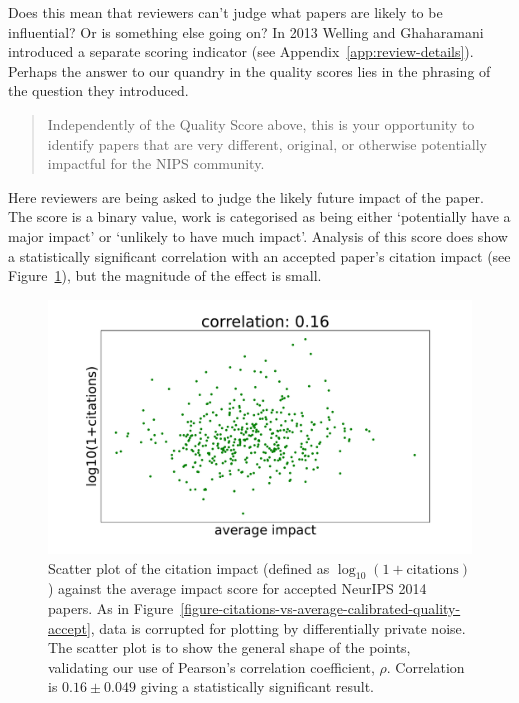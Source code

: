 \documentclass[twoside]{article}
\begin{document}
Does this mean that reviewers can't judge what papers are likely to be
influential? Or is something else going on? In 2013 Welling and
Ghaharamani introduced a separate scoring indicator (see
Appendix~\ref{app:review-details}). 
Perhaps the answer to our quandry in the quality
scores lies in the phrasing of the question they introduced.
\begin{quote}
  Independently of the Quality Score above, this is your opportunity to
identify papers that are very different, original, or otherwise
potentially impactful for the NIPS community.
\end{quote}

Here reviewers are being asked to judge the likely future impact of
the paper. The score is a binary value, work is categorised as being
either `potentially have a major impact' or `unlikely to have much
impact'. Analysis of this score does show a statistically significant
correlation with an accepted paper's citation impact (see Figure~\ref{figure-citations-vs-average-impact-accept}), but the magnitude of
the effect is small.

\begin{figure}[htb]
  \begin{center}
    \includegraphics[width=0.9\columnwidth]{diagrams/neurips/citations-vs-average-impact-accept.pdf}
  \end{center}
  \caption{Scatter plot of the citation impact (defined as
    $\log_{10}(1+\text{citations})$) against the average impact score
    for accepted NeurIPS 2014 papers. As in Figure~\ref{figure-citations-vs-average-calibrated-quality-accept}, data
    is corrupted for plotting by differentially private noise. The
    scatter plot is to show the general shape of the points,
    validating our use of Pearson's correlation coefficient,
    $\rho$. Correlation is $0.16 \pm 0.049$ giving a statistically
    significant result.}
  \label{figure-citations-vs-average-impact-accept}
\end{figure}
\end{document}
